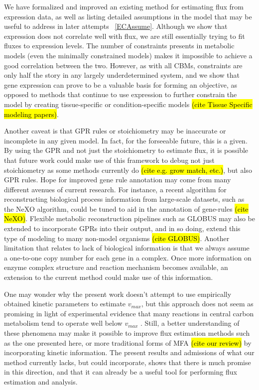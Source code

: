 We have formalized and improved an existing method for estimating flux
from expression data, as well as listing detailed assumptions in the
model that may be useful to address in later attempts ~\ref{ECAssume}.
Although we show that expression does not correlate well with flux, we
are still essentially trying to fit fluxes to expression levels.  The
number of constraints presents in metabolic models (even the minimally
constrained models) makes it impossible to achieve a good correlation
between the two. However, as with all CBMs, constraints are only half
the story in any largely underdetermined system, and we show that gene
expression can prove to be a valuable basis for forming an objective,
as opposed to methods that continue to use expression to further
constrain the model by creating tissue-specific or condition-specific
models \hl{(cite Tissue Specific modeling papers)}.


Another caveat is that GPR rules or stoichiometry may be inaccurate or
incomplete in any given model. In fact, for the forseeable future,
this is a given. By using the GPR and not just the stoichiometry to
estimate flux, it is possible that future work could make use of this
framework to debug not just stoichiometry as some methods currently do
\hl{(cite e.g. grow match, etc.)}, but also GPR rules.  Hope for
improved gene rule annotation may come from many different avenues of
current research. For instance, a recent algorithm for reconstructing
biological process information from large-scale datasets, such as the
NeXO algorithm, could be tuned to aid in the annotation of gene-rules
\hl{(cite NeXO)}. Flexible metabolic reconstruction pipelines such as
GLOBUS may also be extended to incorporate GPRs into their output, and
in so doing, extend this type of modeling to many non-model organisms
\hl{(cite GLOBUS)}.  Another limitation that relates to lack of
biological information is that we always assume a one-to-one copy
number for each gene in a complex. Once more information on enzyme
complex structure and reaction mechanism becomes available, an
extension to the current method could make use of this information.


One may wonder why the present work doesn't attempt to use empirically
obtained kinetic parameters to estimate $v_{max}$, but this approach
does not seem as promising in light of experimental evidence that many
reactions in central carbon metabolism tend to operate well below
$v_{max}$ \cite{Bennett2010}. Still, a better understanding of these
phenomena may make it possible to improve flux estimation methods such
as the one presented here, or more traditional forms of MFA \hl{(cite
  our review)} by incorporating kinetic information.  The present
results and admissions of what our method currently lacks, but could
incorporate, shows that there is much promise in this direction, and
that it can already be a useful tool for performing flux estimation
and analysis.


